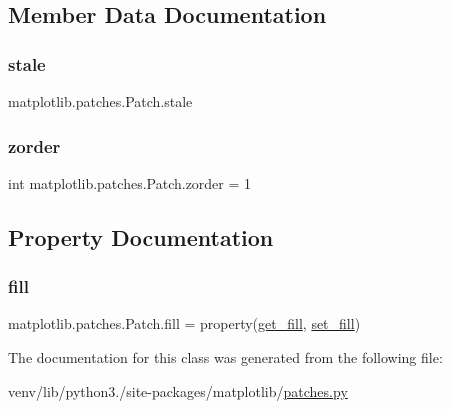 \subsection{Member Data Documentation}
\mbox{\label{classmatplotlib_1_1patches_1_1Patch_a147e510efe54afd0051acedafeebcdc0}} 
\subsubsection{\texorpdfstring{stale}{stale}}
{\footnotesize\ttfamily matplotlib.\+patches.\+Patch.\+stale}

\mbox{\label{classmatplotlib_1_1patches_1_1Patch_af8512e2a52fc94645bbf8986ba26e395}} 
\subsubsection{\texorpdfstring{zorder}{zorder}}
{\footnotesize\ttfamily int matplotlib.\+patches.\+Patch.\+zorder = 1\hspace{0.3cm}{\ttfamily [static]}}



\subsection{Property Documentation}
\mbox{\label{classmatplotlib_1_1patches_1_1Patch_a59e3f9086d41642557cf2f8fb1d57a6d}} 
\subsubsection{\texorpdfstring{fill}{fill}}
{\footnotesize\ttfamily matplotlib.\+patches.\+Patch.\+fill = property(\hyperlink{classmatplotlib_1_1patches_1_1Patch_a9c4c6e91f93689050568889e687bcb56}{get\+\_\+fill}, \hyperlink{classmatplotlib_1_1patches_1_1Patch_a0abc3f61cef5f57b7545efa0de0ba060}{set\+\_\+fill})\hspace{0.3cm}{\ttfamily [static]}}



The documentation for this class was generated from the following file\+:\begin{DoxyCompactItemize}
\item 
venv/lib/python3./site-\/packages/matplotlib/\hyperlink{patches_8py}{patches.\+py}\end{DoxyCompactItemize}
